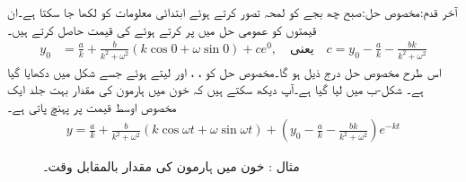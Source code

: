 آخر قدم:مخصوص حل:\quad صبح چھ بجے کو لمحہ  تصور کرتے ہوئے ابتدائی معلومات کو  لکھا جا سکتا ہے۔ان قیمتوں کو عمومی حل میں پر کرتے ہوئے  کی قیمت حاصل کرتے ہیں۔
\begin{align*}
y_0 &=\frac{a}{k}+\frac{b}{k^2+\omega^2}(k\cos 0+\omega \sin 0)+ce^{0}, \quad \text{یعنی}\quad c=y_0-\frac{a}{k}-\frac{bk}{k^2+\omega^2}
\end{align*}
اس طرح مخصوص حل درج ذیل ہو گا۔مخصوص حل کو ، ،  اور  لیتے ہوئے  جسے شکل  میں دکھایا گیا ہے۔ شکل-ب میں  لیا گیا ہے۔آپ دیکھ سکتے ہیں کہ خون میں ہارمون کی مقدار بہت جلد ایک مخصوص اوسط قیمت پر پہنچ پاتی ہے۔
\begin{align*}
y=\frac{a}{k}+\frac{b}{k^2+\omega^2}(k\cos \omega t+\omega \sin \omega t)+(y_0-\frac{a}{k}-\frac{bk}{k^2+\omega^2})e^{-kt}
\end{align*}
%
\begin{figure}
\centering
\begin{subfigure}{0.45\textwidth}
\centering
{}
\caption{}
\end{subfigure} \hfill
\begin{subfigure}{0.45\textwidth}
\centering
{}
\caption{}
\end{subfigure}
\caption{مثال : خون میں ہارمون کی مقدار بالمقابل وقت۔}
\label{شکل_مثال_سادہ_اول_غدود_درقیہ}
\end{figure}

